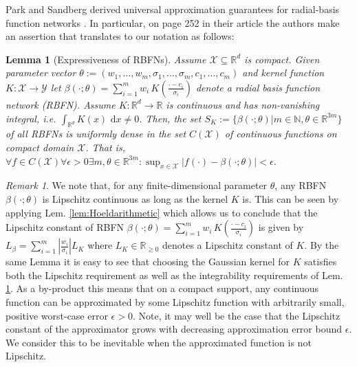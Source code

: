 \documentclass{article} %
\newtheorem{lem}[thm]{Lemma}
\theoremstyle{definition}
\theoremstyle{remark}
\newtheorem{remark}[thm]{Remark}
\newcommand{\abs}[1]{\left\vert#1\right\vert}
\newcommand{\Real}{\mathbb R}
\newcommand{\nat}{\mathbb N}
\renewcommand{\d}[1]{\text{ d}#1}
\newcommand{\inspace}{\ensuremath{ \mathcal X}}
\newcommand{\outspace}{\ensuremath{ \mathcal Y}}
\renewcommand{\d}{\ensuremath{\text{ d}}}
\begin{document}
Park and Sandberg derived universal approximation guarantees for radial-basis function networks \cite{Park1991}. In particular, on page 252 in their article the authors make an assertion that translates to our notation as follows: 

\begin{lem}[Expressiveness of RBFNs] \label{lem:RBFNunifapproxcompact} Assume $\inspace \subseteq \Real^d$ is compact. Given parameter  vector $\theta := (w_1,\ldots,w_m,\sigma_1,...,\sigma_m,c_1,\ldots, c_m)$ and kernel function $K: \inspace \to \outspace $ let $\beta(\cdot;\theta ) = \sum_{i=1}^m w_i \, K(\frac{\cdot - c_i}{\sigma_i} )  $ denote a radial basis function network (RBFN). Assume $K: \Real^d \to \Real$ is continuous and has non-vanishing integral, i.e. $\int_{\Real^d} K(x) \d x \neq 0$.
Then, the set $S_K:= \{ \beta(\cdot; \theta) \vert  m \in \nat, \theta \in \Real^{3m}  \}$ of all RBFNs is uniformly dense in the set $C(\inspace)$ of continuous functions on compact domain $\inspace$. That is,  $\forall f \in C(\inspace) \forall \epsilon >0  \exists m, \theta \in \Real^{3m} : \sup_{x \in \inspace}{ \abs{f(\cdot) -\beta(\cdot;\theta)  } } <\epsilon $. 
\end{lem}

\begin{remark} \label{rem:LipconstofRBFN}
We note that, for any finite-dimensional parameter $\theta$, any RBFN $\beta(\cdot;\theta)$ is Lipschitz continuous as long as the kernel $K$ is. This can be seen by applying Lem. \ref{lem:Hoeldarithmetic} which allows us to conclude that the Lipschitz constant of RBFN $\beta(\cdot;\theta ) = \sum_{i=1}^m w_i \, K(\frac{\cdot - c_i}{\sigma_i} ) $ is given by $L_\beta = \sum_{i=1}^m \abs{\frac{w_i}{\sigma_i}} L_{K}$ where $L_K \in \Real_{\geq 0}$ denotes a Lipschitz constant of $K$. By the same Lemma it is easy to see that choosing the Gaussian kernel for $K$ satisfies both the Lipschitz requirement as well as the integrability requirements of Lem. \ref{lem:RBFNunifapproxcompact}. As a by-product this means that on a compact support, any continuous function can be approximated by some Lipschitz function with arbitrarily small, positive worst-case error $\epsilon >0$. Note, it may well be the case that the Lipschitz constant of the approximator grows with decreasing approximation error bound $\epsilon$. We consider this to be inevitable when the approximated function is not Lipschitz.
\end{remark}
\end{document}
